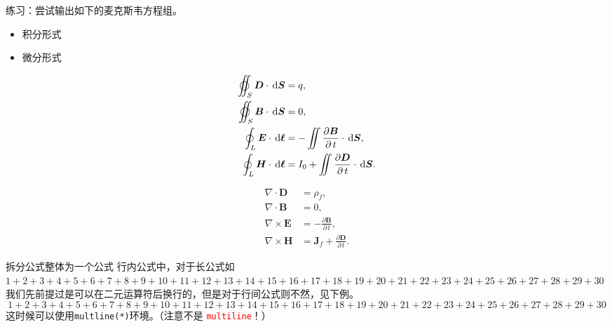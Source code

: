 \begin{frame}
练习：尝试输出如下的麦克斯韦方程组。

	\vspace{2ex} \clean
\begin{minipage}[t]{0.54\textwidth}
	\begin{itemize}
		\item 积分形式
	\end{itemize}
\end{minipage}
\quad
\begin{minipage}[t]{0.4\textwidth}
	\begin{itemize}
		\item 微分形式
	\end{itemize}
\end{minipage}
\begin{minipage}[c]{0.54\textwidth}
	\begin{subequations}
		\begin{align}
			\varoiint_S \bm{D} \cdot \di \bm{S} &= q, \\
			\varoiint_S \bm{B} \cdot \di \bm{S} &= 0, \\
			\oint_L \bm{E} \cdot \di \bm{\ell} &= - \iint \frac{\partial \bm{B}}{\partial\, t} \cdot \di \bm{S}, \\
			\oint_L \bm{H} \cdot \di \bm{\ell} &= I_0 + \iint \frac{\partial \bm{D}}{\partial\, t} \cdot \di \bm{S}.
		\end{align}
	\end{subequations}
\end{minipage}
\quad
\begin{minipage}[c]{0.4\textwidth}
	\begin{subequations}
		\begin{align}
			\nabla \cdot \bm{D} &= \rho_f, \\
			\nabla \cdot \bm{B} &= 0, \\
			\nabla \times \bm{E} &= -\frac{\partial \bm{B}}{\partial\, t}, \\
			\nabla \times \bm{H} &= \bm{J}_f + \frac{\partial \bm{D}}{\partial\, t}.
		\end{align}
		\end{subequations}		
	\end{minipage}
\end{frame}
\begin{frame}{拆分公式}{整体为一个公式}
	行内公式中，对于长公式如$1+2+3+4+5+6+7+8+9+10+11+12+13+14+15+16+17+18+19+20+21+22+23+24+25+26+27+28+29+30$我们先前提过是可以在二元运算符后换行的，但是对于行间公式则不然，见下例。
	\[
	1+2+3+4+5+6+7+8+9+10+11+12+13+14+15+16+17+18+19+20+21+22+23+24+25+26+27+28+29+30
	\]
	这时候可以使用\texttt{multline(*)}环境。（注意不是 \textcolor{red}{\texttt{multiline}}！）
\end{frame}
